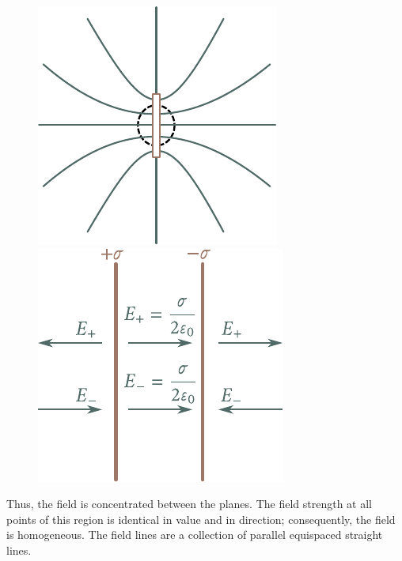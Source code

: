 \begin{figure}[t]
	\begin{minipage}[t]{0.5\linewidth}
		\begin{center}
			\includegraphics[scale=1]{figures/ch_01/fig_1_39.pdf}
			\caption[]{}
			\label{fig:1_39}
		\end{center}
	\end{minipage}
	\hspace{-0.05cm}
	\begin{minipage}[t]{0.5\linewidth}
		\begin{center}
			\includegraphics[scale=1]{figures/ch_01/fig_1_40.pdf}
			\caption[]{}
			\label{fig:1_40}
		\end{center}
	\end{minipage}
\vspace{-0.55cm}
\end{figure}

Thus, the field is concentrated between the planes. The field strength at all points of this region is identical in value and in direction; consequently, the field is homogeneous. The field lines are a collection of parallel equispaced straight lines.

